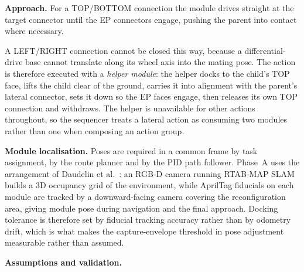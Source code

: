 \documentclass[11pt,a4paper]{article}
\begin{document}
\medskip
\noindent\textbf{Approach.} For a TOP/BOTTOM connection the module drives
straight at the target connector until the EP connectors engage, pushing the
parent into contact where necessary.

A LEFT/RIGHT connection cannot be closed this way, because a differential-drive
base cannot translate along its wheel axis into the mating pose. The action is
therefore executed with a \emph{helper module}: the helper docks to the child's
TOP face, lifts the child clear of the ground, carries it into alignment with
the parent's lateral connector, sets it down so the EP faces engage, then
releases its own TOP connection and withdraws. The helper is unavailable for
other actions throughout, so the sequencer treats a lateral action as consuming
two modules rather than one when composing an action group.

\medskip
\noindent\textbf{Module localisation.} Poses are required in a common frame by
task assignment, by the route planner and by the PID path follower. Phase~A
uses the arrangement of Daudelin et al.\ \cite{daudelin2018}: an RGB-D camera
running RTAB-MAP SLAM builds a 3D occupancy grid of the environment, while
AprilTag fiducials on each module are tracked by a downward-facing camera
covering the reconfiguration area, giving module pose during navigation and the
final approach. Docking tolerance is therefore set by fiducial tracking
accuracy rather than by odometry drift, which is what makes the capture-envelope
threshold in pose adjustment measurable rather than assumed.

\medskip
\noindent\textbf{Assumptions and validation.}
\end{document}
